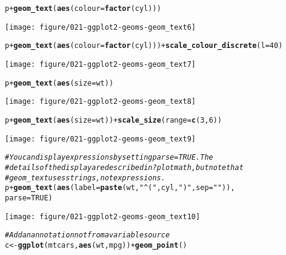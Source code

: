 \documentclass[a4paper,titlepage]{tufte-handout}\usepackage[]{graphicx}\usepackage[]{color}
\makeatletter
\def\maxwidth{ %
  \ifdim\Gin@nat@width>\linewidth
    \linewidth
  \else
    \Gin@nat@width
  \fi
}
\newcommand{\hlnum}[1]{\textcolor[rgb]{0.686,0.059,0.569}{#1}}%
\newcommand{\hlstr}[1]{\textcolor[rgb]{0.192,0.494,0.8}{#1}}%
\newcommand{\hlcom}[1]{\textcolor[rgb]{0.678,0.584,0.686}{\textit{#1}}}%
\newcommand{\hlopt}[1]{\textcolor[rgb]{0,0,0}{#1}}%
\newcommand{\hlstd}[1]{\textcolor[rgb]{0.345,0.345,0.345}{#1}}%
\newcommand{\hlkwb}[1]{\textcolor[rgb]{0.69,0.353,0.396}{#1}}%
\newcommand{\hlkwc}[1]{\textcolor[rgb]{0.333,0.667,0.333}{#1}}%
\newcommand{\hlkwd}[1]{\textcolor[rgb]{0.737,0.353,0.396}{\textbf{#1}}}%
\newenvironment{kframe}{%
 \def\at@end@of@kframe{}%
 \ifinner\ifhmode%
  \def\at@end@of@kframe{\end{minipage}}%
  \begin{minipage}{\columnwidth}%
 \fi\fi%
 \def\FrameCommand##1{\hskip\@totalleftmargin \hskip-\fboxsep
 \colorbox{shadecolor}{##1}\hskip-\fboxsep
     \hskip-\linewidth \hskip-\@totalleftmargin \hskip\columnwidth}%
 \MakeFramed {\advance\hsize-\width
   \@totalleftmargin\z@ \linewidth\hsize
   \@setminipage}}%
 {\par\unskip\endMakeFramed%
 \at@end@of@kframe}
\newenvironment{knitrout}{}{} %
\makeatother
\begin{document}
\begin{knitrout}
\begin{kframe}
\begin{alltt}
\hlstd{p} \hlopt{+} \hlkwd{geom_text}\hlstd{(}\hlkwd{aes}\hlstd{(}\hlkwc{colour}\hlstd{=}\hlkwd{factor}\hlstd{(cyl)))}
\end{alltt}
\end{kframe}
\texttt{[image: figure/021-ggplot2-geoms-geom\_text6]} 
\begin{kframe}\begin{alltt}
\hlstd{p} \hlopt{+} \hlkwd{geom_text}\hlstd{(}\hlkwd{aes}\hlstd{(}\hlkwc{colour}\hlstd{=}\hlkwd{factor}\hlstd{(cyl)))} \hlopt{+} \hlkwd{scale_colour_discrete}\hlstd{(}\hlkwc{l}\hlstd{=}\hlnum{40}\hlstd{)}
\end{alltt}
\end{kframe}
\texttt{[image: figure/021-ggplot2-geoms-geom\_text7]} 
\begin{kframe}\begin{alltt}
\hlstd{p} \hlopt{+} \hlkwd{geom_text}\hlstd{(}\hlkwd{aes}\hlstd{(}\hlkwc{size}\hlstd{=wt))}
\end{alltt}
\end{kframe}
\texttt{[image: figure/021-ggplot2-geoms-geom\_text8]} 
\begin{kframe}\begin{alltt}
\hlstd{p} \hlopt{+} \hlkwd{geom_text}\hlstd{(}\hlkwd{aes}\hlstd{(}\hlkwc{size}\hlstd{=wt))} \hlopt{+} \hlkwd{scale_size}\hlstd{(}\hlkwc{range}\hlstd{=}\hlkwd{c}\hlstd{(}\hlnum{3}\hlstd{,}\hlnum{6}\hlstd{))}
\end{alltt}
\end{kframe}
\texttt{[image: figure/021-ggplot2-geoms-geom\_text9]} 
\begin{kframe}\begin{alltt}
\hlcom{# You can display expressions by setting parse = TRUE.  The}
\hlcom{# details of the display are described in ?plotmath, but note that}
\hlcom{# geom_text uses strings, not expressions.}
\hlstd{p} \hlopt{+} \hlkwd{geom_text}\hlstd{(}\hlkwd{aes}\hlstd{(}\hlkwc{label} \hlstd{=} \hlkwd{paste}\hlstd{(wt,} \hlstr{"^("}\hlstd{, cyl,} \hlstr{")"}\hlstd{,} \hlkwc{sep} \hlstd{=} \hlstr{""}\hlstd{)),}
  \hlkwc{parse} \hlstd{=} \hlnum{TRUE}\hlstd{)}
\end{alltt}
\end{kframe}
\texttt{[image: figure/021-ggplot2-geoms-geom\_text10]} 
\begin{kframe}\begin{alltt}
\hlcom{# Add an annotation not from a variable source}
\hlstd{c} \hlkwb{<-} \hlkwd{ggplot}\hlstd{(mtcars,} \hlkwd{aes}\hlstd{(wt, mpg))} \hlopt{+} \hlkwd{geom_point}\hlstd{()}

\end{alltt}
\end{kframe}
\end{knitrout}
\end{document}
